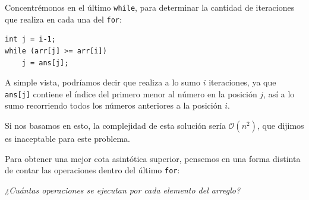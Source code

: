 \documentclass{beamer}
\begin{document}
    \begin{frame}
        Concentrémonos en el último \texttt{while}, para determinar la cantidad de iteraciones que realiza en cada una del \texttt{for}: \pause

        \begin{verbatim}
int j = i-1;
while (arr[j] >= arr[i])
    j = ans[j];
        \end{verbatim}
        \pause

        A simple vista, podríamos decir que realiza a lo sumo $i$ iteraciones, ya que \texttt{ans[j]} contiene el índice del primero menor al número en la posición $j$, así a lo sumo recorriendo todos los números anteriores a la posición $i$. \pause

        Si nos basamos en esto, la complejidad de esta solución sería $\mathcal{O}(n^2)$, que dijimos es inaceptable para este problema. \vspace{4pt} \pause

        Para obtener una mejor cota asintótica superior, pensemos en una forma distinta de contar las operaciones dentro del último \texttt{for}: \pause

        \begin{center}
            \textit{¿Cuántas operaciones se ejecutan por cada elemento del arreglo?}
        \end{center}
    \end{frame}
\end{document}

